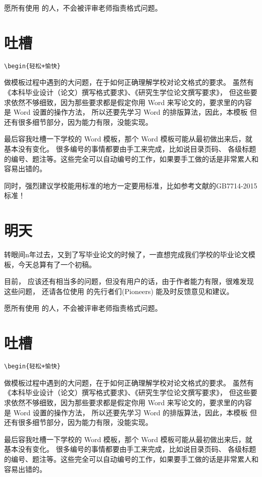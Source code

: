愿所有使用 \nwafuthesis{} 的人，不会被评审老师指责格式问题。

\section{吐槽}

\verb!\begin{轻松+愉快}!

做模板过程中遇到的大问题，在于如何正确理解学校对论文格式的要求。
虽然有《本科毕业设计（论文）撰写格式要求》、《研究生学位论文撰写要求》，
但这些要求依然不够细致，因为那些要求都是假定你用 Word 来写论文的，要求里的内容是 Word 设置的操作方法，
所以还要先学习 Word 的排版算法，因此，本模板
但还有很多细节部分，因为能力有限，没能实现。

最后容我吐槽一下学校的 Word 模板，那个 Word 模板可能从最初做出来后，就基本没有变化。
很多编号的事情都要由手工来完成，比如说目录页码、
各级标题的编号、题注等。这些完全可以自动编号的工作，如果要手工做的话是非常累人和容易出错的。

同时，强烈建议学校能用标准的地方一定要用标准，比如参考文献的GB7714-2015标准！

\section{明天}

转眼间n年过去，又到了写毕业论文的时候了，一直想完成我们学校的毕业论文模板，今天总算有了一个初稿。

目前， \nwafuthesis{} 应该还有相当多的问题，但没有用户的话，由于作者能力有限，很难发现这些问题，
还请各位使用 \nwafuthesis{} 的先行者们(Pioneers) 能及时反馈意见和建议。

愿所有使用 \nwafuthesis{} 的人，不会被评审老师指责格式问题。

\section{吐槽}

\verb!\begin{轻松+愉快}!

做模板过程中遇到的大问题，在于如何正确理解学校对论文格式的要求。
虽然有《本科毕业设计（论文）撰写格式要求》、《研究生学位论文撰写要求》，
但这些要求依然不够细致，因为那些要求都是假定你用 Word 来写论文的，要求里的内容是 Word 设置的操作方法，
所以还要先学习 Word 的排版算法，因此，本模板
但还有很多细节部分，因为能力有限，没能实现。

最后容我吐槽一下学校的 Word 模板，那个 Word 模板可能从最初做出来后，就基本没有变化。
很多编号的事情都要由手工来完成，比如说目录页码、
各级标题的编号、题注等。这些完全可以自动编号的工作，如果要手工做的话是非常累人和容易出错的。


